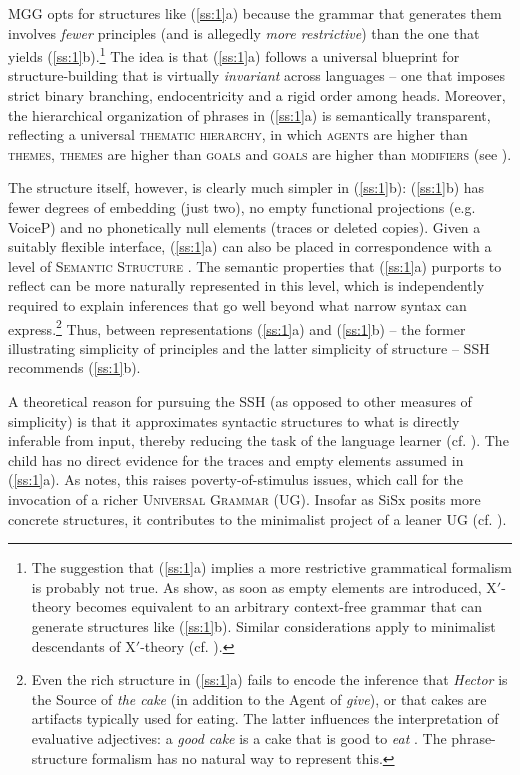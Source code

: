 \documentclass[output=paper,hidelinks]{langscibook}
\begin{document}
MGG opts for structures like (\ref{ss:1}a) because the grammar that generates them involves \textit{fewer} principles (and is allegedly \textit{more restrictive}) than the one that yields (\ref{ss:1}b).\footnote{The suggestion that (\ref{ss:1}a) implies a more restrictive grammatical formalism is probably not true. As \citet{kornai1990the-x-bar} show, as soon as empty elements are introduced, X$'$-theory becomes equivalent to an arbitrary context-free grammar that can generate structures like (\ref{ss:1}b). Similar considerations apply to minimalist descendants of X$'$-theory (cf. \citealt{chomsky1995the-minimalist}).} The idea is that (\ref{ss:1}a) follows a universal blueprint for structure-building that is virtually \textit{invariant} across languages -- one that imposes strict binary branching, endocentricity and a rigid order among heads. Moreover, the hierarchical organization of phrases in (\ref{ss:1}a) is semantically transparent, reflecting a universal \textsc{thematic hierarchy}, in which \textsc{agents} are higher than \textsc{themes}, \textsc{themes} are higher than \textsc{goals} and \textsc{goals} are higher than \textsc{modifiers} (see \citealt{baker1997thematic}).

The structure itself, however, is clearly much simpler in (\ref{ss:1}b): (\ref{ss:1}b)  has fewer degrees of embedding (just two), no empty functional projections (e.g. VoiceP) and no phonetically null elements (traces or deleted copies). Given a suitably flexible interface, (\ref{ss:1}a) can also be placed in correspondence with a level of \textsc{Semantic Structure} \citep{jackendoff1990semantic}. The semantic properties that (\ref{ss:1}a) purports to reflect can be more naturally represented in this level, which is independently required to explain inferences that go well beyond what narrow syntax can express.\footnote{Even the rich structure in (\ref{ss:1}a) fails to encode the inference that \emph{Hector} is the Source of \emph{the cake} (in addition to the Agent of \textit{give}), or that cakes are artifacts typically used for eating. The latter influences the interpretation of evaluative adjectives: a \textit{good cake} is a cake that is good to \textit{eat} \citep{pustejovsky1995generative}. The phrase-structure formalism has no natural way to represent this.} Thus, between representations (\ref{ss:1}a) and (\ref{ss:1}b) -- the former illustrating simplicity of principles and the latter simplicity of structure -- SSH recommends (\ref{ss:1}b).\clearpage

A theoretical reason for pursuing the SSH (as opposed to other measures of simplicity) is that it approximates syntactic structures to what is directly inferable from input, thereby reducing the task of the language learner (cf. \citealt{culicover1998the-limits, culicover1999syntactic, jackendoff2011alternative}). The child has no direct evidence for the traces and empty elements assumed in (\ref{ss:1}a).  As \citet[19]{chomsky1982some} notes, this raises poverty-of-stimulus issues, which call for the invocation of a richer \textsc{Universal Grammar} (UG). Insofar as SiSx posits more concrete structures, it contributes to the minimalist project of a leaner UG (cf. \citealt{chomsky2005three, hornstein2009theory}).
\end{document}
